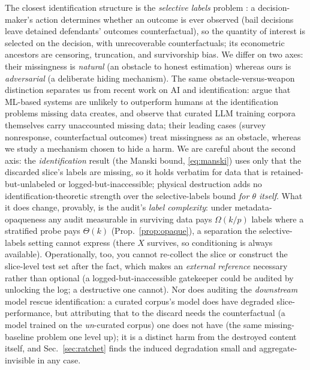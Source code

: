 \documentclass[conference]{IEEEtran}
\begin{document}
The closest identification structure is the \emph{selective labels} problem \cite{lakkaraju2017,kleinberg2018}:
a decision-maker's action determines whether an outcome is ever observed (bail decisions leave detained
defendants' outcomes counterfactual), so the quantity of interest is selected on the
decision, with unrecoverable counterfactuals; its econometric ancestors are censoring, truncation, and
survivorship bias. We differ on two axes: their missingness is \emph{natural} (an obstacle to honest
estimation) whereas ours is \emph{adversarial} (a deliberate hiding mechanism). The same obstacle-versus-weapon
distinction separates us from recent work on AI and identification: \cite{dominitz2026} argue that ML-based
systems are unlikely to outperform humans at the identification problems missing data creates, and observe
that curated LLM training corpora themselves carry unaccounted missing data; their leading cases (survey
nonresponse, counterfactual outcomes) treat missingness as an obstacle, whereas we study a mechanism chosen
to hide a harm. We are careful about the
second axis: the \emph{identification} result (the Manski bound, \eqref{eq:manski}) uses only that the discarded slice's
labels are missing, so it holds verbatim for data that is retained-but-unlabeled or logged-but-inaccessible;
physical destruction adds no identification-theoretic strength over the selective-labels bound \emph{for
$\theta$ itself}. What it does change, provably, is the audit's \emph{label complexity}: under
metadata-opaqueness any audit measurable in surviving data pays $\Omega(k/p)$ labels where a stratified probe
pays $\Theta(k)$
(Prop.~\ref{prop:opaque}), a separation the selective-labels setting cannot express (there $X$ survives, so
conditioning is always available). Operationally, too, you cannot re-collect the slice or construct the
slice-level test set after the fact, which makes an \emph{external reference} necessary rather than optional
(a logged-but-inaccessible gatekeeper could be audited by unlocking the log; a destructive one cannot). Nor does
auditing the \emph{downstream} model rescue identification: a curated corpus's model does have degraded
slice-performance, but attributing that to the discard needs the counterfactual (a model trained on the
\emph{un}-curated corpus) one does not have (the same missing-baseline problem one level up); it is a distinct
harm from the destroyed content itself, and Sec.~\ref{sec:ratchet} finds the induced degradation small and
aggregate-invisible in any case.
\end{document}

